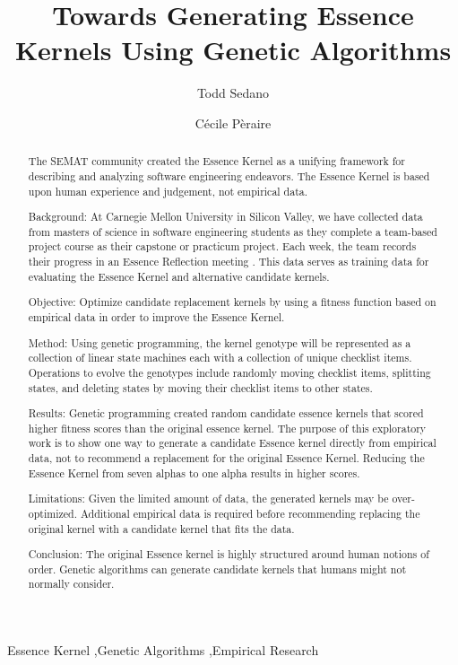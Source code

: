 \documentclass[preprint,12pt,3p]{elsarticle}
\begin{document}
\begin{frontmatter}

\title{Towards Generating Essence Kernels Using Genetic Algorithms}

\author{Todd Sedano}
\author{C\'ecile P\`eraire}
\address{Carnegie Mellon University}
\address{Silicon Valley Campus}
\address{Moffett Field, CA 94035, USA}



\begin{abstract}
The SEMAT community created the Essence Kernel as a unifying framework for describing and analyzing software engineering endeavors. \cite{JacobsonQueue} The Essence Kernel is based upon human experience and judgement, not empirical data. 

Background: At Carnegie Mellon University in Silicon Valley, we have collected data from masters of science in software engineering students as they complete a team-based project course as their capstone or practicum project. Each week, the team records their progress in an Essence Reflection meeting \cite{EASE2014}. This data serves as training data for evaluating the Essence Kernel and alternative candidate kernels.

Objective: Optimize candidate replacement kernels by using a fitness function based on empirical data in order to improve the Essence Kernel.

Method: Using genetic programming, the kernel genotype will be represented as a collection of linear state machines each with a collection of unique checklist items. Operations to evolve the genotypes include randomly moving checklist items, splitting states, and deleting states by moving their checklist items to other states. 

Results: Genetic programming created random candidate essence kernels that scored higher fitness scores than the original essence kernel. The purpose of this exploratory work is to show one way to generate a candidate Essence kernel directly from empirical data, not to recommend a replacement for the original Essence Kernel. Reducing the Essence Kernel from seven alphas to one alpha results in higher scores.

Limitations: Given the limited amount of data, the generated kernels may be over-optimized. Additional empirical data is required before recommending replacing the original kernel with a candidate kernel that fits the data.

Conclusion: The original Essence kernel is highly structured around human notions of order. Genetic algorithms can generate candidate kernels that humans might not normally consider.
\end{abstract}

\begin{keyword}
Essence Kernel \sep Genetic Algorithms \sep Empirical Research
\end{keyword}

\end{frontmatter}
\end{document}
